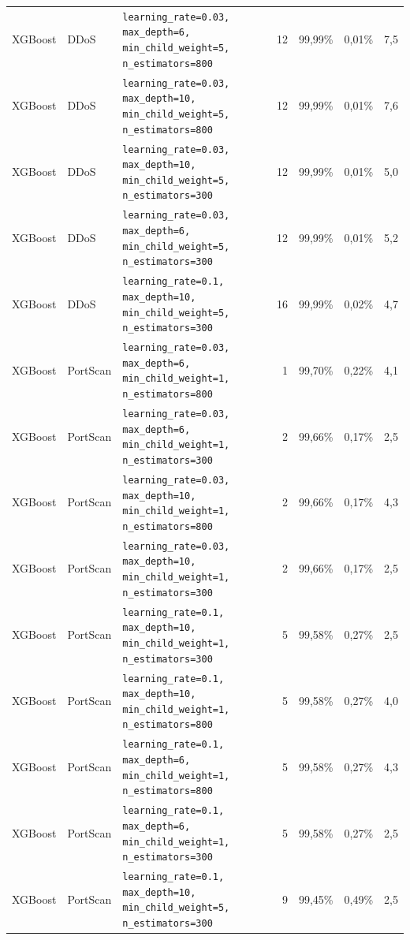 {{\begin{tabularx}{\textwidth}{@{}llLrrrr@{}}
XGBoost & DDoS & \scriptsize\texttt{learning\_rate=0.03, max\_depth=6, min\_child\_weight=5, n\_estimators=800} & 12 & 99,99\% & 0,01\% & 7,5\\
XGBoost & DDoS & \scriptsize\texttt{learning\_rate=0.03, max\_depth=10, min\_child\_weight=5, n\_estimators=800} & 12 & 99,99\% & 0,01\% & 7,6\\
XGBoost & DDoS & \scriptsize\texttt{learning\_rate=0.03, max\_depth=10, min\_child\_weight=5, n\_estimators=300} & 12 & 99,99\% & 0,01\% & 5,0\\
XGBoost & DDoS & \scriptsize\texttt{learning\_rate=0.03, max\_depth=6, min\_child\_weight=5, n\_estimators=300} & 12 & 99,99\% & 0,01\% & 5,2\\
XGBoost & DDoS & \scriptsize\texttt{learning\_rate=0.1, max\_depth=10, min\_child\_weight=5, n\_estimators=300} & 16 & 99,99\% & 0,02\% & 4,7\\
XGBoost & PortScan & \scriptsize\texttt{learning\_rate=0.03, max\_depth=6, min\_child\_weight=1, n\_estimators=800} & 1 & 99,70\% & 0,22\% & 4,1\\
XGBoost & PortScan & \scriptsize\texttt{learning\_rate=0.03, max\_depth=6, min\_child\_weight=1, n\_estimators=300} & 2 & 99,66\% & 0,17\% & 2,5\\
XGBoost & PortScan & \scriptsize\texttt{learning\_rate=0.03, max\_depth=10, min\_child\_weight=1, n\_estimators=800} & 2 & 99,66\% & 0,17\% & 4,3\\
XGBoost & PortScan & \scriptsize\texttt{learning\_rate=0.03, max\_depth=10, min\_child\_weight=1, n\_estimators=300} & 2 & 99,66\% & 0,17\% & 2,5\\
XGBoost & PortScan & \scriptsize\texttt{learning\_rate=0.1, max\_depth=10, min\_child\_weight=1, n\_estimators=300} & 5 & 99,58\% & 0,27\% & 2,5\\
XGBoost & PortScan & \scriptsize\texttt{learning\_rate=0.1, max\_depth=10, min\_child\_weight=1, n\_estimators=800} & 5 & 99,58\% & 0,27\% & 4,0\\
XGBoost & PortScan & \scriptsize\texttt{learning\_rate=0.1, max\_depth=6, min\_child\_weight=1, n\_estimators=800} & 5 & 99,58\% & 0,27\% & 4,3\\
XGBoost & PortScan & \scriptsize\texttt{learning\_rate=0.1, max\_depth=6, min\_child\_weight=1, n\_estimators=300} & 5 & 99,58\% & 0,27\% & 2,5\\
XGBoost & PortScan & \scriptsize\texttt{learning\_rate=0.1, max\_depth=10, min\_child\_weight=5, n\_estimators=300} & 9 & 99,45\% & 0,49\% & 2,5\\

\end{tabularx}}}
